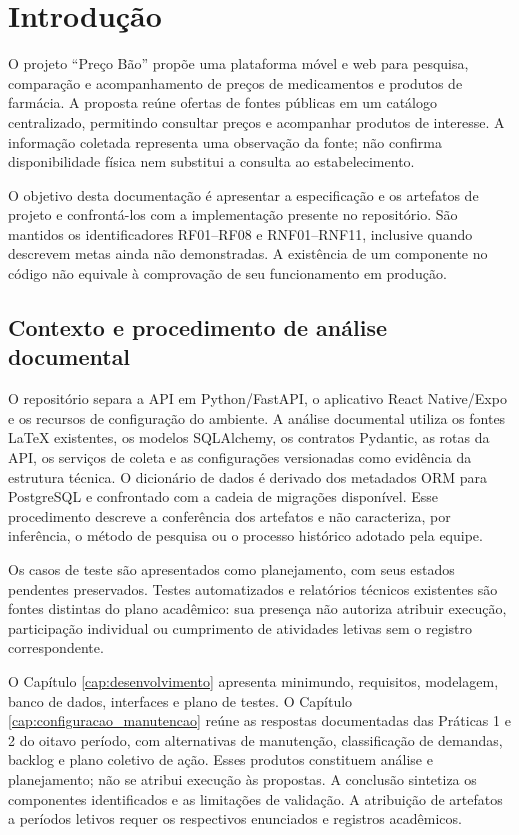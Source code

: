 \chapter{Introdução}\label{cap:introducao}

O projeto ``Preço Bão'' propõe uma plataforma móvel e web para pesquisa, comparação e acompanhamento de preços de medicamentos e produtos de farmácia. A proposta reúne ofertas de fontes públicas em um catálogo centralizado, permitindo consultar preços e acompanhar produtos de interesse. A informação coletada representa uma observação da fonte; não confirma disponibilidade física nem substitui a consulta ao estabelecimento.

O objetivo desta documentação é apresentar a especificação e os artefatos de projeto e confrontá-los com a implementação presente no repositório. São mantidos os identificadores RF01--RF08 e RNF01--RNF11, inclusive quando descrevem metas ainda não demonstradas. A existência de um componente no código não equivale à comprovação de seu funcionamento em produção.

\section{Contexto e procedimento de análise documental}

O repositório separa a API em Python/FastAPI, o aplicativo React Native/Expo e os recursos de configuração do ambiente. A análise documental utiliza os fontes LaTeX existentes, os modelos SQLAlchemy, os contratos Pydantic, as rotas da API, os serviços de coleta e as configurações versionadas como evidência da estrutura técnica. O dicionário de dados é derivado dos metadados ORM para PostgreSQL e confrontado com a cadeia de migrações disponível. Esse procedimento descreve a conferência dos artefatos e não caracteriza, por inferência, o método de pesquisa ou o processo histórico adotado pela equipe.

Os casos de teste são apresentados como planejamento, com seus estados pendentes preservados. Testes automatizados e relatórios técnicos existentes são fontes distintas do plano acadêmico: sua presença não autoriza atribuir execução, participação individual ou cumprimento de atividades letivas sem o registro correspondente.

O Capítulo \ref{cap:desenvolvimento} apresenta minimundo, requisitos, modelagem, banco de dados, interfaces e plano de testes. O Capítulo \ref{cap:configuracao_manutencao} reúne as respostas documentadas das Práticas 1 e 2 do oitavo período, com alternativas de manutenção, classificação de demandas, backlog e plano coletivo de ação. Esses produtos constituem análise e planejamento; não se atribui execução às propostas. A conclusão sintetiza os componentes identificados e as limitações de validação. A atribuição de artefatos a períodos letivos requer os respectivos enunciados e registros acadêmicos.
